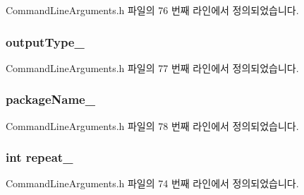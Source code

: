 Command\+Line\+Arguments.\+h 파일의 76 번째 라인에서 정의되었습니다.

\subsubsection[{\texorpdfstring{output\+Type\+\_\+}{outputType_}}]{ output\+Type\+\_\+\hspace{0.3cm}{\ttfamily [private]}}\hypertarget{class_command_line_arguments_abc5e0c7954aafcf27c9603b01f608faf}{}\label{class_command_line_arguments_abc5e0c7954aafcf27c9603b01f608faf}


Command\+Line\+Arguments.\+h 파일의 77 번째 라인에서 정의되었습니다.

\subsubsection[{\texorpdfstring{package\+Name\+\_\+}{packageName_}}]{ package\+Name\+\_\+\hspace{0.3cm}{\ttfamily [private]}}\hypertarget{class_command_line_arguments_ab4f0e1fe33d9e9ee52d8333ca3a966f3}{}\label{class_command_line_arguments_ab4f0e1fe33d9e9ee52d8333ca3a966f3}


Command\+Line\+Arguments.\+h 파일의 78 번째 라인에서 정의되었습니다.

\subsubsection[{\texorpdfstring{repeat\+\_\+}{repeat_}}]{\setlength{\rightskip}{0pt plus 5cm}int repeat\+\_\+\hspace{0.3cm}{\ttfamily [private]}}\hypertarget{class_command_line_arguments_ae817df6683a04a17ebb450687325eb8d}{}\label{class_command_line_arguments_ae817df6683a04a17ebb450687325eb8d}


Command\+Line\+Arguments.\+h 파일의 74 번째 라인에서 정의되었습니다.

